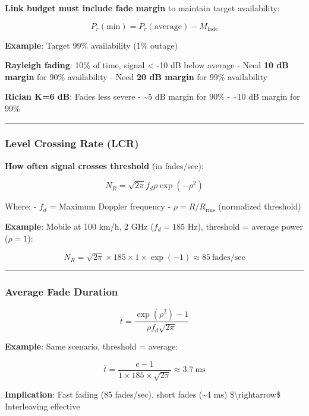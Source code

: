 \textbf{Link budget must include fade margin} to maintain target
availability:

\[
P_r(\text{min}) = P_r(\text{average}) - M_{\text{fade}}
\]

\textbf{Example}: Target 99\% availability (1\% outage)

\textbf{Rayleigh fading}: 10\% of time, signal \textless{} -10 dB below
average - Need \textbf{10 dB margin} for 90\% availability - Need
\textbf{20 dB margin} for 99\% availability

\textbf{Rician K=6 dB}: Fades less severe - \textasciitilde5 dB margin
for 90\% - \textasciitilde10 dB margin for 99\%

\begin{center}\rule{0.5\linewidth}{0.5pt}\end{center}

\subsubsection{Level Crossing Rate (LCR)}\label{level-crossing-rate-lcr}

\textbf{How often signal crosses threshold} (in fades/sec):

\[
N_R = \sqrt{2\pi} f_d \rho \exp(-\rho^2)
\]

Where: - \(f_d\) = Maximum Doppler frequency -
\(\rho = R/R_{\text{rms}}\) (normalized threshold)

\textbf{Example}: Mobile at 100 km/h, 2 GHz (\(f_d = 185\) Hz),
threshold = average power (\(\rho = 1\)):

\[
N_R = \sqrt{2\pi} \times 185 \times 1 \times \exp(-1) \approx 85\ \text{fades/sec}
\]

\begin{center}\rule{0.5\linewidth}{0.5pt}\end{center}

\subsubsection{Average Fade Duration}\label{average-fade-duration}

\[
\bar{t} = \frac{\exp(\rho^2) - 1}{\rho f_d \sqrt{2\pi}}
\]

\textbf{Example}: Same scenario, threshold = average:

\[
\bar{t} = \frac{e - 1}{1 \times 185 \times \sqrt{2\pi}} \approx 3.7\ \text{ms}
\]

\textbf{Implication}: Fast fading (85 fades/sec), short fades
(\textasciitilde4 ms) \$\textbackslash rightarrow\$ Interleaving
effective

